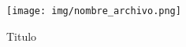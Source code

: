 \documentclass[a4paper]{article}
\begin{document}


\begin{figure}[H] 
\centering
\texttt{[image: img/nombre\_archivo.png]}
\caption{Titulo}
\label{fig:etiqueta}
\end{figure}
\end{document}
